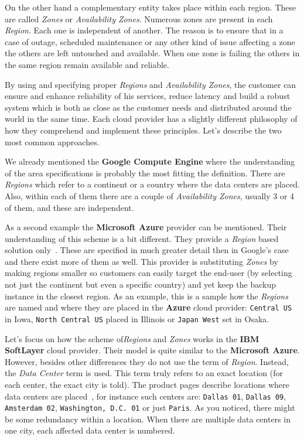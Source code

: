On the other hand a complementary entity takes place within each region. These are called \emph{Zones} or \emph{Availability Zones}. Numerous zones are present in each \emph{Region}. Each one is independent of another. The reason is to ensure that in a case of outage, scheduled maintenance or any other kind of issue affecting a zone the others are left untouched and available. When one zone is failing the others in the same region remain available and reliable.

By using and specifying proper \emph{Regions} and \emph{Availability Zones}, the customer can ensure and enhance reliability of his services, reduce latency and build a robust system which is both as close as the customer needs and distributed around the world in the same time. Each cloud provider has a slightly different philosophy of how they comprehend and implement these principles. Let's describe the two most common approaches.

We already mentioned the \textbf{Google Compute Engine} where the understanding of the area specifications is probably the most fitting the definition. There are \emph{Regions} which refer to a continent or a country where the data centers are placed. Also, within each of them there are a couple of \emph{Availability Zones}, usually 3 or 4 of them, and these are independent.

As a second example the \textbf{Microsoft Azure} provider can be mentioned. Their understanding of this scheme is a bit different. They provide a \emph{Region} based solution only~\cite{azure}. These are specified in much greater detail then in Google's case and there exist more of them as well. This provider is substituting \emph{Zones} by making regions smaller so customers can easily target the end-user (by selecting not just the continent but even a specific country) and yet keep the backup instance in the closest region. As an example, this is a sample how the \emph{Regions} are named and where they are placed in the \textbf{Azure} cloud provider: \texttt{Central US} in Iowa, \texttt{North Central US} placed in Illinois or \texttt{Japan West} set in Osaka.

Let's focus on how the scheme of\emph{Regions} and \emph{Zones} works in the \textbf{IBM SoftLayer} cloud provider. Their model is quite similar to the \textbf{Microsoft Azure}. However, besides other differences they do not use the term of \emph{Region}. Instead, the \emph{Data Center} term is used. This term truly refers to an exact location (for each center, the exact city is told). The product pages describe locations where data centers are placed~\cite{softlayer_datacenters}, for instance such centers are: \texttt{Dallas 01}, \texttt{Dallas 09}, \texttt{Amsterdam 02}, \texttt{Washington, D.C. 01} or just \texttt{Paris}. As you noticed, there might be some redundancy within a location. When there are multiple data centers in one city, each affected data center is numbered.

